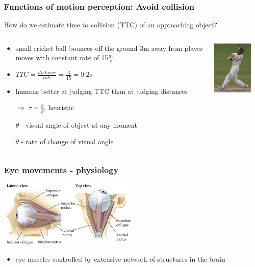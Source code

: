 \documentclass[]{beamer}
\begin{document}
\begin{frame}
\frametitle{Functions of motion perception: Avoid collision}
\begin{overlayarea}{110mm}{70mm}
How do we estimate time to collision (TTC) of an approaching object?\begin{columns}[T]
\begin{column}{70mm}
\begin{itemize}
 \item small cricket ball bounces off the ground 3m away from player moves with constant rate of 15$\frac{m}{s}$
 \item $TTC = \frac{distance}{rate} = \frac{3}{15} = 0.2s$
 \item humans better at judging TTC than at judging distances
 \item[$\Rightarrow$] $\tau = \frac{\theta}{\dot{\theta}}$, heuristic
  \item[] $\theta$ - visual angle of object at any moment
  \item[] $\dot{\theta}$ - rate of change of visual angle 
\end{itemize}
\end{column}

\begin{column}{50mm}
\begin{center}
\includegraphics[width=30mm]{figs/l7/ttc.png} 
\end{center}
\end{column}
 \end{columns}
\end{overlayarea}
\end{frame}


\begin{frame}
\frametitle{Eye movements - physiology}
\begin{overlayarea}{110mm}{70mm}
 \begin{center}
\includegraphics[width=70mm]{figs/l7/six_eye_muscles.png} 
\end{center}
\begin{itemize}
 \item eye muscles controlled by extensive network of structures in the brain
\end{itemize}

\end{overlayarea}
\end{frame}
\end{document}
